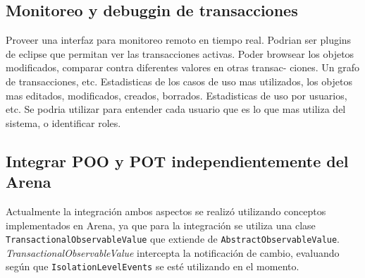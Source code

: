 	\subsection{Monitoreo y debuggin de transacciones}
		Proveer una interfaz para monitoreo remoto en tiempo real. Podrian ser plugins
		de eclipse que permitan ver las transacciones activas. 
		Poder browsear los objetos modificados, comparar contra diferentes valores en otras transac-
		ciones. Un grafo de transacciones, etc. 
		Estadisticas de los casos de uso mas utilizados, los
		objetos mas editados, modificados, creados, borrados. 
		Estadisticas de uso por usuarios, etc. Se podria
		utilizar para entender cada usuario que es lo que mas
		utiliza del sistema, o identificar roles.

	
	\subsection{Integrar POO y POT independientemente del Arena}
		Actualmente la integración ambos aspectos se realizó utilizando conceptos
		implementados en Arena, ya que para la integración se utiliza una clase
		\lstinline|TransactionalObservableValue| que extiende de
		\lstinline|AbstractObservableValue|. \emph{TransactionalObservableValue}
		intercepta la notificación de cambio, evaluando según que
		\lstinline|IsolationLevelEvents| se esté utilizando en el momento.
		 
